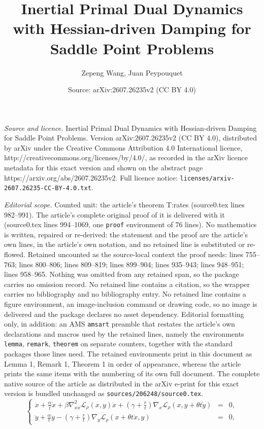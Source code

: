 \documentclass[10pt,a4paper]{amsart}
\title{Inertial Primal Dual Dynamics with Hessian-driven Damping for Saddle Point Problems}
\author{Zepeng Wang, Juan Peypouquet}
\date{Source: arXiv:2607.26235v2 (CC BY 4.0)}
\begin{document}
\maketitle

\noindent\emph{Source and licence.} Inertial Primal Dual Dynamics with Hessian-driven Damping for Saddle Point Problems. Version arXiv:2607.26235v2 (CC BY 4.0), distributed by arXiv under the Creative Commons Attribution 4.0 International licence, http://creativecommons.org/licenses/by/4.0/, as recorded in the arXiv licence metadata for this exact version and shown on the abstract page https://arxiv.org/abs/2607.26235v2. Full licence notice: \texttt{licenses/arxiv-2607.26235-CC-BY-4.0.txt}.\par\smallskip

\noindent\textit{Editorial scope.} Counted unit: the article's theorem T:rates (source0.tex lines 982--991). The article's complete original proof of it is delivered with it (source0.tex lines 994--1069, one \texttt{proof} environment of 76 lines). No mathematics is written, repaired or re-derived: the statement and the proof are the article's own lines, in the article's own notation, and no retained line is substituted or re-flowed.  Retained uncounted as the source-local context the proof needs: lines 755--763; lines 800--806; lines 809--819; lines 899--904; lines 935--943; lines 948--951; lines 958--965.  Nothing was omitted from any retained span, so the package carries no omission record.  No retained line contains a citation, so the wrapper carries no bibliography and no bibliography entry.  No retained line contains a figure environment, an image-inclusion command or drawing code, so no image is delivered and the package declares no asset dependency.  Editorial formatting only, in addition: an AMS \texttt{amsart} preamble that restates the article's own declarations and macros used by the retained lines, namely the environments \texttt{lemma}, \texttt{remark}, \texttt{theorem} on separate counters, together with the standard packages those lines need.  The retained environments print in this document as Lemma 1, Remark 1, Theorem 1 in order of appearance, whereas the article prints the same items with the numbering of its own full document.  The complete native source of the article as distributed in the arXiv e-print for this exact version is bundled unchanged as \texttt{sources/206248/source0.tex}.
\begin{equation}\label{inertial_primal_dual_system}\tag{PD-AVD-H}
\left\{
\begin{array}{rcl}
\ddot{x} + \frac{\alpha}{t}\dot{x} + \beta\nabla^2_{xx}\mathcal{L}_\rho \left( x, y \right) \dot{x} 
 + \left( \gamma + \frac{r}{t} \right) \nabla_x \mathcal{L}_\rho\left( x, y + \theta t \dot{y} \right) &=& 0, \\[2pt]
\ddot{y} + \frac{\alpha}{t}\dot{y} - \left( \gamma + \frac{r}{t} \right) \nabla_y \mathcal{L}_\rho\left( x + \theta t \dot{x}, y \right) &=& 0,
\end{array}
\right.
\end{equation}
\end{document}
